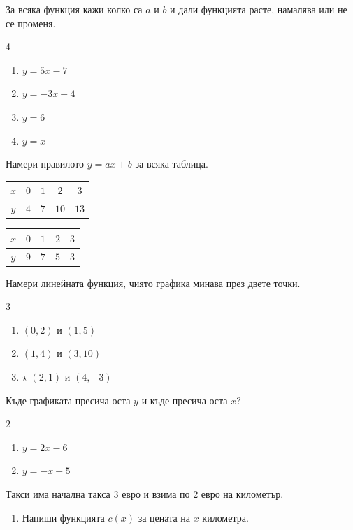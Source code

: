 \documentclass[11pt,a4paper]{article}
\makeatletter
\newcommand{\grp}[2]{\par\vspace{8pt}{\large\bfseries\textcolor{cblue}{#1}\hspace{0.5em}#2}\par\vspace{2pt}}
\newcommand{\st}{\textcolor{corange}{$\star$}}
\newcommand{\bgalph}[1]{\expandafter\@bgalph\csname c@#1\endcsname}
\newcommand{\@bgalph}[1]{\ifcase#1\or а\or б\or в\or г\or д\or е\or ж\or з\or и\or к\fi}
\makeatother
\begin{document}
\grp{В}{Линейни функции}
\begin{tasks}
  \item За всяка функция кажи колко са $a$ и $b$ и дали функцията расте, намалява или не се променя.
  \begin{multicols}{4}
  \begin{enumerate}[label=\bgalph*)]
    \item $y=5x-7$
    \item $y=-3x+4$
    \item $y=6$
    \item $y=x$
  \end{enumerate}
  \end{multicols}
  \item Намери правилото $y=ax+b$ за всяка таблица.

  \begin{tabular}{c|cccc} $x$ & $0$ & $1$ & $2$ & $3$\\\hline $y$ & $4$ & $7$ & $10$ & $13$\end{tabular}
  \hspace{1.5cm}
  \begin{tabular}{c|cccc} $x$ & $0$ & $1$ & $2$ & $3$\\\hline $y$ & $9$ & $7$ & $5$ & $3$\end{tabular}
  \item Намери линейната функция, чиято графика минава през двете точки.
  \begin{multicols}{3}
  \begin{enumerate}[label=\bgalph*)]
    \item $(0,2)$ и $(1,5)$
    \item $(1,4)$ и $(3,10)$
    \item \st{} $(2,1)$ и $(4,-3)$
  \end{enumerate}
  \end{multicols}
  \item Къде графиката пресича оста $y$ и къде пресича оста $x$?
  \begin{multicols}{2}
  \begin{enumerate}[label=\bgalph*)]
    \item $y=2x-6$
    \item $y=-x+5$
  \end{enumerate}
  \end{multicols}
  \item Такси има начална такса $3$ евро и взима по $2$ евро на километър.
  \begin{enumerate}[label=\bgalph*)]
    \item Напиши функцията $c(x)$ за цената на $x$ километра.

\end{enumerate}
\end{tasks}
\end{document}
